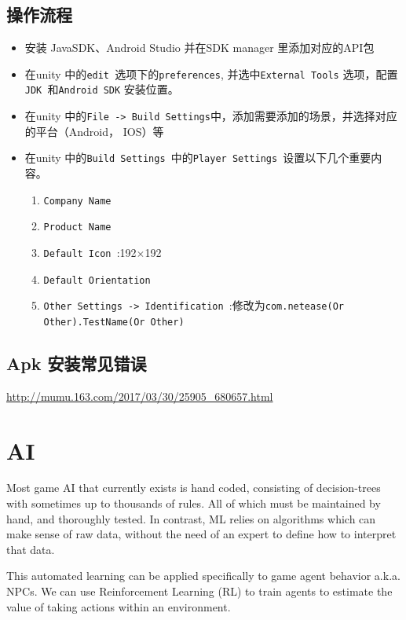 \documentclass[UTF8,a4paper,12pt]{ctexbook}
\begin{document}
	\section{操作流程}
		\begin{itemize}
			\item 安装 JavaSDK、Android Studio 并在SDK manager 里添加对应的API包
			\item 在unity 中的\verb|edit |选项下的\verb|preferences|, 并选中\verb|External Tools| 选项，配置\verb|JDK |和\verb|Android SDK| 安装位置。
			\item 在unity 中的\verb|File -> Build Settings|中，添加需要添加的场景，并选择对应的平台（Android， IOS）等
			\item 在unity 中的\verb|Build Settings |中的\verb|Player Settings |设置以下几个重要内容。
				\begin{enumerate}
					\item \verb|Company Name |
					\item \verb|Product Name |
					\item \verb|Default Icon |:192$\times$192
					\item \verb|Default Orientation |
					\item \verb|Other Settings -> Identification |:修改为\verb|com.netease(Or Other).TestName(Or Other)|
				\end{enumerate}
		\end{itemize}	
	
	\section{Apk 安装常见错误}
		\url{http://mumu.163.com/2017/03/30/25905_680657.html}

	

\chapter{AI}
	Most game AI that currently exists is hand coded, consisting of decision-trees with sometimes up to thousands of rules. All of which must be maintained by hand, and thoroughly tested. In contrast, ML relies on algorithms which can make sense of raw data, without the need of an expert to define how to interpret that data.
	
	This automated learning can be applied specifically to game agent behavior a.k.a. NPCs. We can use Reinforcement Learning (RL) to train agents to estimate the value of taking actions within an environment. 
	
\end{document}

